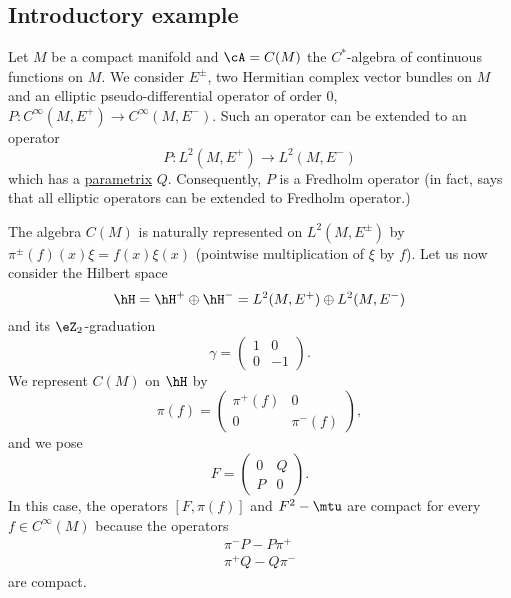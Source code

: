 \subsection{Introductory example}

Let $M$ be a compact manifold and $\cA=C(M)$ the $C^*$-algebra of continuous functions on $M$. We consider $E^{\pm}$, two Hermitian complex vector bundles on $M$ and an elliptic pseudo-differential operator of order $0$, $P\colon  C^{\infty}(M,E^+)\to  C^{\infty}(M,E^-)$. Such an operator can be extended to an operator
\begin{equation}
	P\colon L^2(M,E^+)\to L^2(M,E^-)
\end{equation}
which has a \hyperlink{DefParametrix}{parametrix} $Q$. Consequently, $P$ is a Fredholm operator (in fact,  says that all elliptic operators can be extended to Fredholm operator.)

The algebra $C(M)$ is naturally represented on $L^2(M,E^{\pm})$ by $\pi^{\pm}(f)(x)\xi=f(x)\xi(x)$ (pointwise multiplication of $\xi$ by $f$). Let us now consider the Hilbert space
\begin{equation}
	\hH=\hH^+\oplus\hH^-=L^2(M,E^{+})\oplus L^2(M,E^{-})
\end{equation}
and its $\eZ_2$-graduation
\begin{equation}
	\gamma=\begin{pmatrix}
		1 & 0  \\
		0 & -1
	\end{pmatrix}.
\end{equation}
We represent $C(M)$ on $\hH$ by
\begin{equation}
	\pi(f)=\begin{pmatrix}
		\pi^+(f) & 0        \\
		0        & \pi^-(f)
	\end{pmatrix},
\end{equation}
and we pose
\begin{equation}
	F=\begin{pmatrix}
		0 & Q \\
		P & 0
	\end{pmatrix}.
\end{equation}
In this case, the operators $[F,\pi(f)]$ and $F^2-\mtu$ are compact for every $f\in  C^{\infty}(M)$ because the operators
\begin{subequations}
	\begin{align}
		\pi^-P-P\pi^+ \\
		\pi^+Q-Q\pi^-
	\end{align}
\end{subequations}
are compact.

